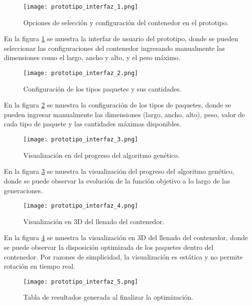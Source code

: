 \documentclass[9pt,a4paper]{rho}
\begin{document}
\begin{figure}[h!]
    \centering
    \texttt{[image: prototipo\_interfaz\_1.png]}
    \caption{Opciones de selección y configuración del contenedor en el prototipo.}
    \label{fig:prototipo_interfaz_1}
\end{figure}

En la figura \ref{fig:prototipo_interfaz_1} se muestra la interfaz de usuario del prototipo, donde se pueden seleccionar las configuraciones del contenedor ingresando manualmente las dimensiones como el largo, ancho y alto, y el peso máximo.

\begin{figure}[h!]
    \centering
    \texttt{[image: prototipo\_interfaz\_2.png]}
    \caption{Configuración de los tipos paquetes y sus cantidades.}
    \label{fig:prototipo_interfaz_2}
\end{figure}

En la figura \ref{fig:prototipo_interfaz_2} se muestra la configuración de los tipos de paquetes, donde se pueden ingresar manualmente las dimensiones (largo, ancho, alto), peso, valor de cada tipo de paquete y las cantidades máximas disponibles.

\begin{figure}[h!]
    \centering
    \texttt{[image: prototipo\_interfaz\_3.png]}
    \caption{Visualización en del progreso del algoritmo genético.}
    \label{fig:prototipo_interfaz_3}
\end{figure}

En la figura \ref{fig:prototipo_interfaz_3} se muestra la visualización del progreso del algoritmo genético, donde se puede observar la evolución de la función objetivo a lo largo de las generaciones.

\begin{figure}[h!]
    \centering
    \texttt{[image: prototipo\_interfaz\_4.png]}
    \caption{Visualización en 3D del llenado del contenedor.}
    \label{fig:prototipo_interfaz_4}
\end{figure}

En la figura \ref{fig:prototipo_interfaz_4} se muestra la visualización en 3D del llenado del contenedor, donde se puede observar la disposición optimizada de los paquetes dentro del contenedor. Por razones de simplicidad, la visualización es estática y no permite rotación en tiempo real.

\begin{figure}[h!]
    \centering
    \texttt{[image: prototipo\_interfaz\_5.png]}
    \caption{Tabla de resultados generada al finalizar la optimización.}
    \label{fig:prototipo_interfaz_5}
\end{figure}
\end{document}
